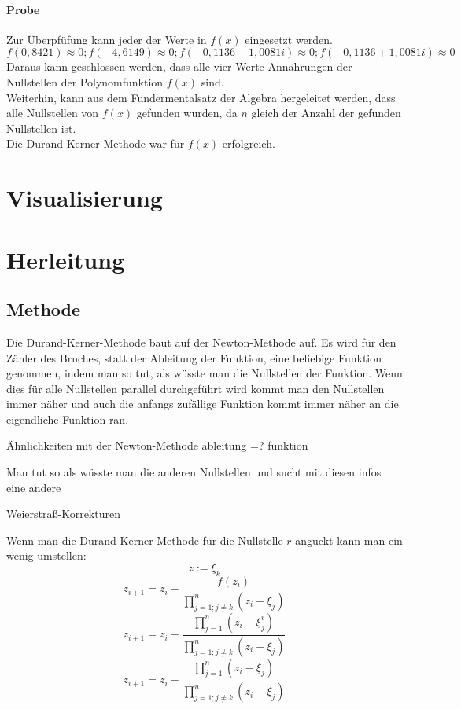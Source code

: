 \documentclass[12pt]{article}
\begin{document}
\paragraph{Probe}
Zur Überpfüfung kann jeder der Werte in $f(x)$ eingesetzt werden.
\begin{displaymath}
    f(0,8421) \approx 0; f(-4,6149) \approx 0; f(-0,1136 - 1,0081i) \approx 0; f(-0,1136 + 1,0081i) \approx 0
\end{displaymath}
Daraus kann geschlossen werden, dass alle vier Werte Annährungen der Nullstellen der Polynomfunktion $f(x)$ sind. \\
Weiterhin, kann aus dem Fundermentalsatz der Algebra hergeleitet werden, dass alle Nullstellen von $f(x)$ gefunden wurden, da $n$ gleich der Anzahl der gefunden Nullstellen ist. \\
Die Durand-Kerner-Methode war für $f(x)$ erfolgreich.

\section{Visualisierung}

\section{Herleitung}
\subsection{Methode}
Die Durand-Kerner-Methode baut auf der Newton-Methode auf. Es wird für den Zähler des Bruches, statt der Ableitung der Funktion, eine beliebige Funktion genommen, indem man so tut, als wüsste man die Nullstellen der Funktion. Wenn dies für alle Nullstellen parallel durchgeführt wird kommt man den Nullstellen immer näher und auch die anfangs zufällige Funktion kommt immer näher an die eigendliche Funktion ran.

Ähnlichkeiten mit der Newton-Methode
ableitung =? funktion

Man tut so als wüsste man die anderen Nullstellen und sucht mit diesen infos eine andere

Weierstraß-Korrekturen

Wenn man die Durand-Kerner-Methode für die Nullstelle $r$ anguckt kann man ein wenig umstellen:
\[z := \xi_k\]
\[z_{i+1} = z_i - \frac{f(z_i)}{\prod_{j=1;j\neq k}^n (z_i-\xi_j)}\]
\[z_{i+1} = z_i - \frac{\prod_{j=1}^n (z_i-\xi_j^i)}{\prod_{j=1;j\neq k}^n (z_i-\xi_j)}\]
\[z_{i+1} = z_i - \frac{\prod_{j=1}^n (z_i-\xi_j)}{\prod_{j=1;j\neq k}^n (z_i-\xi_j)}\]
\end{document}
